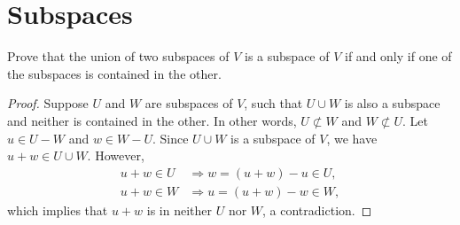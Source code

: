 

\section{Subspaces}

\begin{exercise}{12}
	Prove that the union of two subspaces of \( V \) is a subspace of \( V \) if
	and only if one of the subspaces is contained in the other.
\end{exercise}

\begin{proof}
	Suppose \( U \) and \( W \) are subspaces of \( V \), such that \( U \cup W \)
	is also a subspace and neither is contained in the other.
	In other words, \( U \not\subset W \) and \( W \not\subset U \).
	Let \( u \in U - W \) and \( w \in W - U \).
	Since \( U \cup W \) is a subspace of \( V \), we have \( u + w \in U \cup W \).
	However,
	\begin{align*}
		u + w \in U &\Rightarrow w = (u + w) - u \in U, \\
		u + w \in W &\Rightarrow u = (u + w) - w \in W,
	\end{align*}
	which implies that \( u + w \) is in neither \( U \) nor \( W \), a contradiction.
\end{proof}

